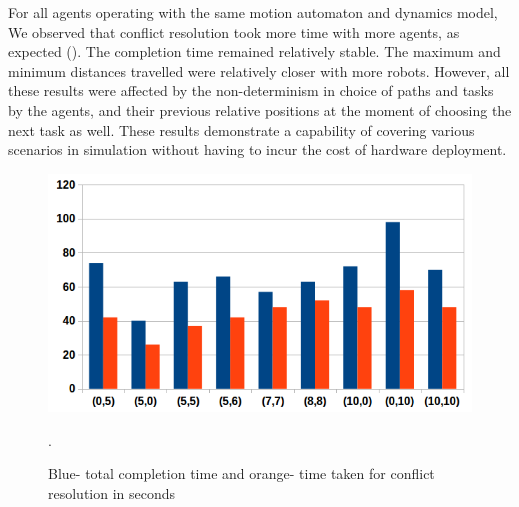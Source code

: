  For all agents operating with the same motion automaton and dynamics model, We observed that conflict resolution took more time with more agents, as expected (). The completion time remained relatively stable. The maximum and minimum distances travelled were relatively closer with more robots. However, all these results were affected by the non-determinism in choice of paths and tasks by the agents, and their previous relative positions at the moment of choosing the next task as well. These results demonstrate a capability of covering various scenarios in simulation without having to incur the cost of hardware deployment.  
 
\begin{figure}[h!]
\includegraphics[width=.5\textwidth]{figs/completion.png}\hfill
\caption{\small  Blue-  total completion time and orange- time taken for conflict resolution in seconds}. 
\label{fig:taskstats}
\end{figure}